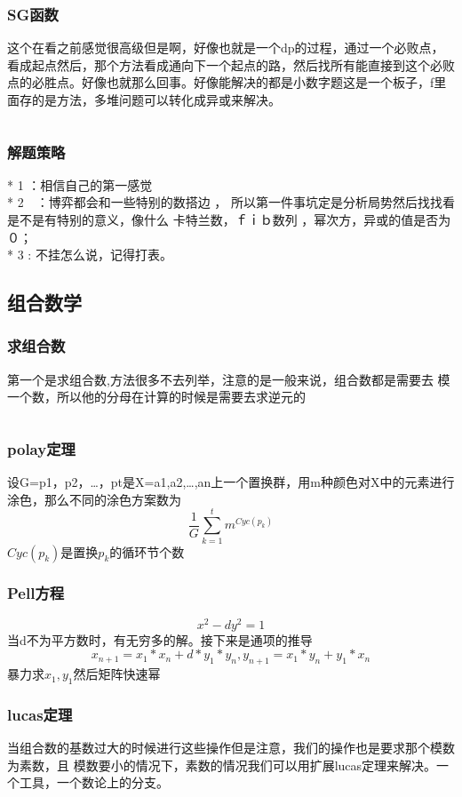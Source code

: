 \documentclass[a4paper,11pt]{article}
\begin{document}
\begin{CJK}{UTF8}{gbsn}
\subsubsection{SG函数}
这个在看之前感觉很高级但是啊，好像也就是一个dp的过程，通过一个必败点，看成起点然后，那个方法看成通向下一个起点的路，然后找所有能直接到这个必败点的必胜点。好像也就那么回事。好像能解决的都是小数字题这是一个板子，f里面存的是方法，多堆问题可以转化成异或来解决。
\inputminted{c++}{../scoure/math/boyi.cpp}
\subsubsection{解题策略}
* 1  ：相信自己的第一感觉\\
* 2　：博弈都会和一些特别的数搭边 ， 所以第一件事坑定是分析局势然后找找看是不是有特别的意义，像什么 卡特兰数，ｆｉｂ数列 ，幂次方，异或的值是否为０；\\
* 3  : 不挂怎么说，记得打表。\\
\subsection{组合数学}
\subsubsection{求组合数}
第一个是求组合数,方法很多不去列举，注意的是一般来说，组合数都是需要去
模一个数，所以他的分母在计算的时候是需要去求逆元的
\inputminted{c++}{../scoure/math/zuhe.cpp}
\subsubsection{polay定理}
设G={p1，p2，…，pt}是X={a1,a2,…,an}上一个置换群，用m种颜色对X中的元素进行涂色，那么不同的涂色方案数为
$$\frac{1}{G}\sum_{k=1}^t m^{Cyc(p_k)}$$
$Cyc(p_k)$是置换$p_k$的循环节个数
\subsubsection{Pell方程}
$$x^2-dy^2=1$$
当d不为平方数时，有无穷多的解。接下来是通项的推导
$$ x_{n+1} = x_1*x_n+d*y_1*y_n,y_{n+1} = x_1*y_n + y_1*x_n $$
暴力求$x_1,y_1$然后矩阵快速幂
\subsubsection{lucas定理}
当组合数的基数过大的时候进行这些操作但是注意，我们的操作也是要求那个模数为素数，且
模数要小的情况下，素数的情况我们可以用扩展lucas定理来解决。一个工具，一个数论上的分支。
\inputminted{c++}{../scoure/math/lucas.cpp}

\end{CJK}
\end{document}
